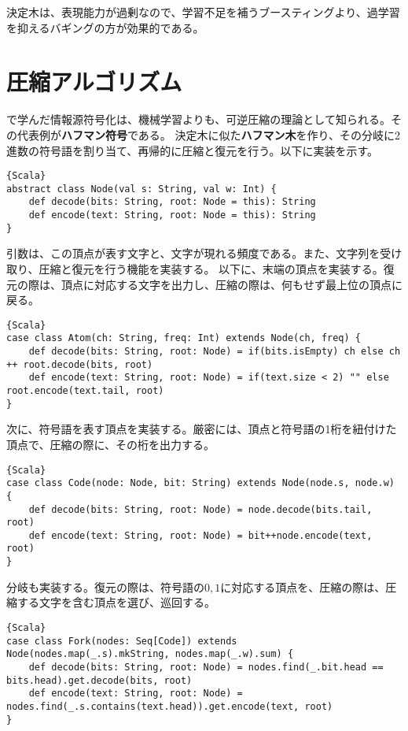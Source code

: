 \documentclass[10pt,a4paper]{book}
\begin{document}
決定木は、表現能力が過剰なので、学習不足を補うブースティングより、過学習を抑えるバギングの方が効果的である。

\section{圧縮アルゴリズム\label{sect:huff}}

で学んだ情報源符号化は、機械学習よりも、可逆圧縮の理論として知られる。その代表例が\textbf{ハフマン符号}である。
決定木に似た\textbf{ハフマン木}を作り、その分岐に2進数の符号語を割り当て、再帰的に圧縮と復元を行う。以下に実装を示す。

\begin{Verbatim}{Scala}
abstract class Node(val s: String, val w: Int) {
	def decode(bits: String, root: Node = this): String
	def encode(text: String, root: Node = this): String
}
\end{Verbatim}

引数は、この頂点が表す文字と、文字が現れる頻度である。また、文字列を受け取り、圧縮と復元を行う機能を実装する。
以下に、末端の頂点を実装する。復元の際は、頂点に対応する文字を出力し、圧縮の際は、何もせず最上位の頂点に戻る。

\begin{Verbatim}{Scala}
case class Atom(ch: String, freq: Int) extends Node(ch, freq) {
	def decode(bits: String, root: Node) = if(bits.isEmpty) ch else ch ++ root.decode(bits, root)
	def encode(text: String, root: Node) = if(text.size < 2) "" else root.encode(text.tail, root)
}
\end{Verbatim}

次に、符号語を表す頂点を実装する。厳密には、頂点と符号語の1桁を紐付けた頂点で、圧縮の際に、その桁を出力する。

\begin{Verbatim}{Scala}
case class Code(node: Node, bit: String) extends Node(node.s, node.w) {
	def decode(bits: String, root: Node) = node.decode(bits.tail, root)
	def encode(text: String, root: Node) = bit++node.encode(text, root)
}
\end{Verbatim}

分岐も実装する。復元の際は、符号語の$0,1$に対応する頂点を、圧縮の際は、圧縮する文字を含む頂点を選び、巡回する。

\begin{Verbatim}{Scala}
case class Fork(nodes: Seq[Code]) extends Node(nodes.map(_.s).mkString, nodes.map(_.w).sum) {
	def decode(bits: String, root: Node) = nodes.find(_.bit.head == bits.head).get.decode(bits, root)
	def encode(text: String, root: Node) = nodes.find(_.s.contains(text.head)).get.encode(text, root)
}
\end{Verbatim}
\end{document}
